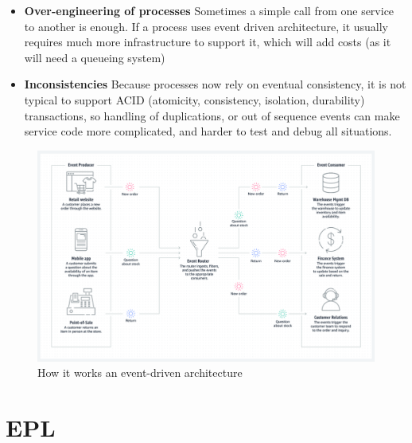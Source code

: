 \documentclass[10pt,a4paper]{article}
\begin{document}
\begin{itemize}
	\item \textbf{Over-engineering of processes} 
Sometimes a simple call from one service to another is enough. If a process uses event driven architecture, it usually requires much more infrastructure to support it, which will add costs (as it will need a queueing system)
	\item \textbf{Inconsistencies} 
Because processes now rely on eventual consistency, it is not typical to support ACID (atomicity, consistency, isolation, durability) transactions, so handling of duplications, or out of sequence events can make service code more complicated, and harder to test and debug all situations.
\end{itemize}

\pagebreak
\begin{figure}[ht!]
 \hfill \includegraphics[width=400pt]{images/event-driven-arch.png}\hspace*{\fill}
 \caption{How it works an event-driven architecture}
\end{figure} 

\pagebreak
\section{EPL}
\end{document}
